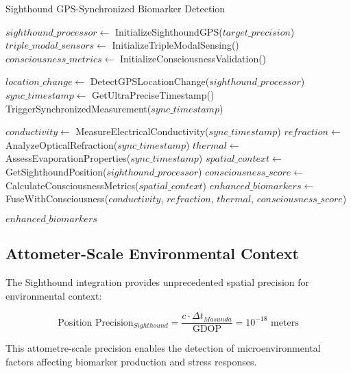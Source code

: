 \documentclass[12pt,a4paper]{article}
\begin{document}
\begin{algorithm}
\caption{Sighthound GPS-Synchronized Biomarker Detection}
\begin{algorithmic}[1]
    \State $sighthound\_processor \gets$ InitializeSighthoundGPS($target\_precision$)
    \State $triple\_modal\_sensors \gets$ InitializeTripleModalSensing()
    \State $consciousness\_metrics \gets$ InitializeConsciousnessValidation()
    
    \State $location\_change \gets$ DetectGPSLocationChange($sighthound\_processor$)
        \State $sync\_timestamp \gets$ GetUltraPreciseTimestamp()
        \State TriggerSynchronizedMeasurement($sync\_timestamp$)
    \EndIf
    
    \State $conductivity \gets$ MeasureElectricalConductivity($sync\_timestamp$)
    \State $refraction \gets$ AnalyzeOpticalRefraction($sync\_timestamp$)
    \State $thermal \gets$ AssessEvaporationProperties($sync\_timestamp$)
    \State $spatial\_context \gets$ GetSighthoundPosition($sighthound\_processor$)
    \State $consciousness\_score \gets$ CalculateConsciousnessMetrics($spatial\_context$)
    \State $enhanced\_biomarkers \gets$ FuseWithConsciousness($conductivity$, $refraction$, $thermal$, $consciousness\_score$)
    
    \State \Return $enhanced\_biomarkers$
\EndProcedure
\end{algorithmic}
\end{algorithm}

\subsection{Attometer-Scale Environmental Context}

The Sighthound integration provides unprecedented spatial precision for environmental context:

\begin{equation}
\text{Position Precision}_{Sighthound} = \frac{c \cdot \Delta t_{Masunda}}{\text{GDOP}} = 10^{-18} \text{ meters}
\end{equation}

This attometre-scale precision enables the detection of microenvironmental factors affecting biomarker production and stress responses.
\end{document}

